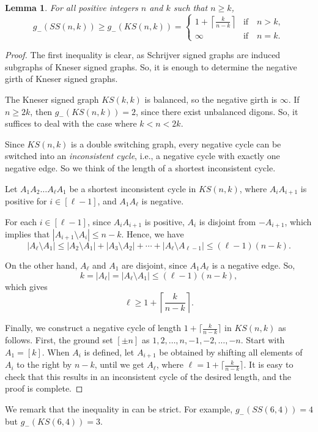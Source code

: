\documentclass{article}
\newcommand{\KS}{\mathit{KS}} %
\newcommand{\SSG}{\mathit{SS}} %
\newtheorem{lemma}[theorem]{Lemma}
\begin{document}
\begin{lemma}\label{lem:negGirth}
    For all positive integers $n$ and $k$ such that $n\geq k$,
    $$g_-(\SSG(n,k))\geq g_-(\KS(n,k))=\begin{cases}
    1+\left\lceil\frac{k}{n-k}\right\rceil &\text{if} \quad n> k,\\
    \infty &\text{if} \quad n=k.
    \end{cases}
    $$
\end{lemma}
\begin{proof}
    The first inequality is clear, as Schrijver signed graphs are induced subgraphs of Kneser signed graphs. So, it is enough to determine the negative girth of Kneser signed graphs. 
    
    The Kneser signed graph $\KS(k,k)$ is balanced, so the negative girth is $\infty$. If $n\geq 2k$, then $g_-(\KS(n,k))=2$, since there exist unbalanced digons. So, it suffices to deal with the case where $k< n< 2k$.
    
    Since $\KS(n,k)$ is a double switching graph, every negative cycle can be switched into an \emph{inconsistent cycle}, i.e., a negative cycle with exactly one negative edge. So we think of the length of a shortest inconsistent cycle.

    Let $A_1A_2\ldots A_\ell A_1$ be a shortest inconsistent cycle in $\KS(n,k)$, where $A_iA_{i+1}$ is positive for $i\in [\ell-1]$, and $A_1A_\ell$ is negative.

    For each $i\in[\ell-1]$, since $A_iA_{i+1}$ is positive, $A_{i}$ is disjoint from $-A_{i+1}$, which implies that $|A_{i+1}\setminus A_i|\leq n-k.$ Hence, we have
    $$|A_\ell\setminus A_1|\leq |A_2\setminus A_1|+|A_3\setminus A_2|+\cdots+|A_\ell\setminus A_{\ell-1}|\leq (\ell-1)(n-k).$$

    On the other hand, $A_\ell$ and $A_1$ are disjoint, since $A_1A_\ell$ is a negative edge. So, $$k=|A_\ell|=|A_\ell\setminus A_1|\leq(\ell-1)(n-k),$$
    which gives 
    $$\ell\geq 1+ \left\lceil\frac{k}{n-k}\right\rceil.$$

    Finally, we construct a negative cycle of length $1+\lceil\frac{k}{n-k}\rceil$ in $\KS(n,k)$ as follows. First, the ground set $[\pm n]$ as ${1,2,\ldots,n, -1,-2,\ldots,-n}$. Start with $A_1=[k]$. When $A_i$ is defined, let $A_{i+1}$ be obtained by shifting all elements of $A_i$ to the right by $n-k$, until we get $A_\ell$, where $\ell=1+\lceil\frac{k}{n-k}\rceil$. It is easy to check that this results in an inconsistent cycle of the desired length, and the proof is complete.
\end{proof}
We remark that the inequality in  can be strict. For example, $g_-(\SSG(6,4))=4$ but $g_-(\KS(6,4))=3$.
\end{document}
